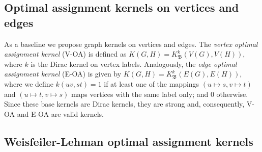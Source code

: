 \documentclass{article}
\newcommand{\Assign}{\ensuremath{\mathfrak{B}}\xspace}
\begin{document}
\subsection{Optimal assignment kernels on vertices and edges} \label{sec:baseline}

As a baseline we propose graph kernels on vertices and edges.
The \emph{vertex optimal assignment kernel} (V-OA) is defined as 
$K(G,H) = K_\Assign^k(V(G), V(H))$, where $k$ is the Dirac kernel on vertex 
labels.
Analogously, the \emph{edge optimal assignment kernel} (E-OA) is given by
$K(G,H) = K_\Assign^k(E(G), E(H))$, where we define $k(uv, st) = 1$ if at least
one of the mappings $(u \mapsto s, v \mapsto t)$ and $(u \mapsto t, v \mapsto s)$
maps vertices with the same label only; and $0$ otherwise.
Since these base kernels are Dirac kernels, they are strong and, consequently, 
V-OA and E-OA are valid kernels.


\subsection{Weisfeiler-Lehman optimal assignment kernels} \label{sec:wl}
\end{document}
